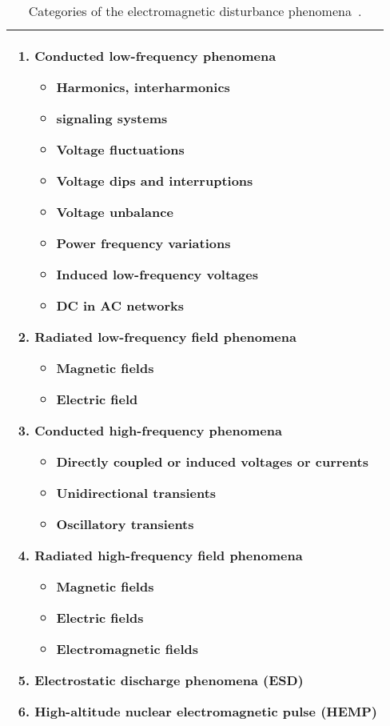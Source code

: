 \begin{table}[!p]
\centering
\renewcommand{\tabcolsep}{0.08cm}
\caption{Categories of the electromagnetic disturbance phenomena~\cite{iec_61000}.}
\begin{tabular}{m{12cm}}
\hline \hline
\begin{enumerate} [itemsep=5pt,topsep=4pt]
\item \textbf{Conducted low-frequency phenomena}
\begin{itemize}[itemsep=5pt,topsep=0pt]
\item Harmonics, interharmonics
\item signaling systems
\item Voltage fluctuations
\item Voltage dips and interruptions
\item Voltage unbalance
\item Power frequency variations
\item Induced low-frequency voltages
\item DC in AC networks
\end{itemize}

\item \textbf{Radiated low-frequency field phenomena}
\begin{itemize}[itemsep=5pt,topsep=0pt]
\item Magnetic fields
\item Electric field
\end{itemize}
\end{enumerate}


\begin{enumerate}[itemsep=5pt,topsep=4pt]
\setcounter{enumi}{2} 
\item \textbf{Conducted high-frequency phenomena}
\begin{itemize}[itemsep=5pt,topsep=0pt]
\item Directly coupled or induced voltages or currents
\item Unidirectional transients
\item Oscillatory transients
\end{itemize}

\item \textbf{Radiated high-frequency field phenomena}
\begin{itemize}[itemsep=5pt,topsep=0pt]
\item Magnetic fields
\item Electric fields
\item Electromagnetic fields
\end{itemize}
\item \textbf{Electrostatic discharge phenomena (ESD)}
\item \textbf{High-altitude nuclear electromagnetic pulse (HEMP)}
\end{enumerate}
\\
\hline
\end{tabular}
\label{tbl:iec_classification}
\vspace{2cm}
\end{table}



